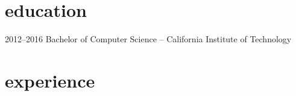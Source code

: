 \documentclass[]{mills-cv} %
\begin{document}

\section{education}

\begin{entrylist}
\entry
{2012--2016}
{Bachelor of Computer Science \normalfont -- California Institute of Technology}{}{}
\end{entrylist}


\section{experience}
\end{document}
